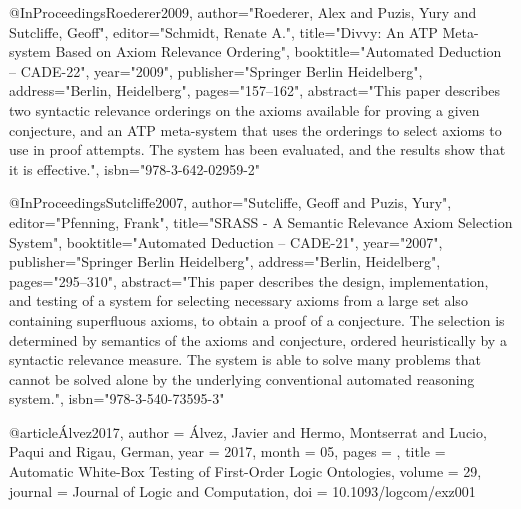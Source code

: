 \documentclass[english,version-2020-11]{uzl-thesis}
\begin{document}
\begin{bibtex-entries}
@InProceedings{Roederer2009,
  author="Roederer, Alex
  and Puzis, Yury
  and Sutcliffe, Geoff",
  editor="Schmidt, Renate A.",
  title="Divvy: An ATP Meta-system Based on Axiom Relevance Ordering",
  booktitle="Automated Deduction -- CADE-22",
  year="2009",
  publisher="Springer Berlin Heidelberg",
  address="Berlin, Heidelberg",
  pages="157--162",
  abstract="This paper describes two syntactic relevance orderings on the axioms available for proving a given conjecture, and an ATP meta-system that uses the orderings to select axioms to use in proof attempts. The system has been evaluated, and the results show that it is effective.",
  isbn="978-3-642-02959-2"
}

@InProceedings{Sutcliffe2007,
  author="Sutcliffe, Geoff
  and Puzis, Yury",
  editor="Pfenning, Frank",
  title="SRASS - A Semantic Relevance Axiom Selection System",
  booktitle="Automated Deduction -- CADE-21",
  year="2007",
  publisher="Springer Berlin Heidelberg",
  address="Berlin, Heidelberg",
  pages="295--310",
  abstract="This paper describes the design, implementation, and testing of a system for selecting necessary axioms from a large set also containing superfluous axioms, to obtain a proof of a conjecture. The selection is determined by semantics of the axioms and conjecture, ordered heuristically by a syntactic relevance measure. The system is able to solve many problems that cannot be solved alone by the underlying conventional automated reasoning system.",
  isbn="978-3-540-73595-3"
}

@article{Álvez2017,
  author = {Álvez, Javier and Hermo, Montserrat and Lucio, Paqui and Rigau, German},
  year = {2017},
  month = {05},
  pages = {},
  title = {Automatic White-Box Testing of First-Order Logic Ontologies},
  volume = {29},
  journal = {Journal of Logic and Computation},
  doi = {10.1093/logcom/exz001}
}


\end{bibtex-entries}



%
%
%
%
\end{document}
